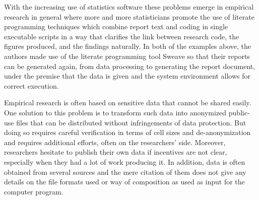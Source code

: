 \documentclass{sig-alternate}
\begin{document}
With the increasing use of statistics software \cite{RePEc_hum_wpaper_sfb649dp2011_020}
these problems emerge in empirical research in general where more and more statisticians promote the use of literate programming techniques  
\cite{leisch2011executable}
\cite{rossini2003literate}
which combine report text and coding in single executable scripts in a way that clarifies the link between research code, the figures produced, and the findings naturally.
In both of the examples above, the authors made use of the literate programming tool Sweave \cite{lmucs_papers_Leisch_2002} 
so that their reports can be generated again, from data processing to generating the report document, under the premise that the data is given and the system environment allows for correct execution.


Empirical research is often based on sensitive data that cannot be shared easily.
One solution to this problem is to transform such data into anonymized public-use files that can be distributed without infringements of data protection.
But doing so requires careful verification in terms of cell sizes and de-anonymization and requires additional efforts, often on the researchers' side.
Moreover, researchers hesitate to publish their own data if incentives are not clear, especially when they had a lot of work producing it.
In addition, data is often obtained from several sources and the mere citation of them does not give any details on the file formats used or way of composition as used as input for the computer program.
\end{document}
